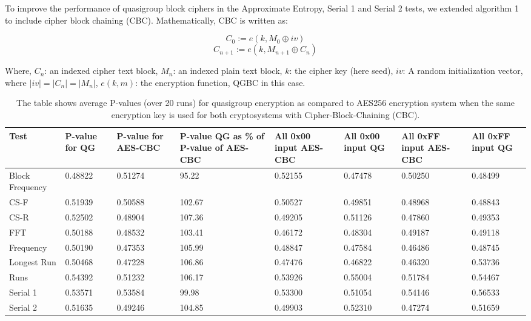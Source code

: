\documentclass[conference]{IEEEtran}
\begin{document}
To improve the performance of quasigroup block ciphers in the Approximate Entropy, Serial 1 and Serial 2 tests, we extended algorithm 1 to include cipher block chaining (CBC). Mathematically, CBC is written as:

\[ C_0 := e(k, M_0\oplus iv) \]
\[ C_{n+1} := e(k, M_{n+1}\oplus C_n) \]

Where, $C_n$: an indexed cipher text block, $M_n$: an indexed plain text block, $k$: the cipher key (here seed), $iv$: A random initialization vector, where $|iv|=|C_n|=|M_n|$, $e(k,m)$: the encryption function, QGBC in this case.

\begin{table*}
\centering
\begin{tabular}{|p{2cm}|p{1.5cm}|p{1.5cm}|p{2.25cm}||p{1.5cm}|p{1.5cm}|p{1.5cm}|p{1.5cm}|}
\hline
Test & P-value for QG&  P-value for AES-CBC&  P-value QG as \% of P-value of AES-CBC& All 0x00 input AES-CBC& All 0x00 input QG& All 0xFF input AES-CBC& All 0xFF input QG\\ \hline
Block Frequency& 0.48822&  0.51274&  95.22& 0.52155& 0.47478& 0.50250& 0.48499 \\ \hline
CS-F& 0.51939&  0.50588&  102.67& 0.50527& 0.49851& 0.48968& 0.48843\\ \hline
CS-R& 0.52502&  0.48904&  107.36& 0.49205& 0.51126& 0.47860& 0.49353\\ \hline
FFT& 0.50188&  0.48532&  103.41& 0.46172& 0.48304& 0.49187& 0.49118\\ \hline
Frequency& 0.50190&  0.47353&  105.99& 0.48847& 0.47584& 0.46486& 0.48745\\ \hline
Longest Run& 0.50468&  0.47228&  106.86& 0.47476& 0.46822& 0.46320& 0.53736\\ \hline
Runs& 0.54392&  0.51232&  106.17& 0.53926& 0.55004& 0.51784& 0.54467\\ \hline
Serial 1& 0.53571&  0.53584&  99.98& 0.53300& 0.51054& 0.54146& 0.56533\\ \hline
Serial 2& 0.51635&  0.49246&  104.85& 0.49903& 0.52310& 0.47274& 0.51659\\ \hline
\end{tabular}
\caption{The table shows average P-values (over 20 runs) for quasigroup encryption as compared to AES256 encryption system when the same encryption key is used for both cryptosystems with Cipher-Block-Chaining (CBC).}
\vspace{-0.28in}
\label{table_P-value_with_CBC}
\end{table*}
\end{document}
